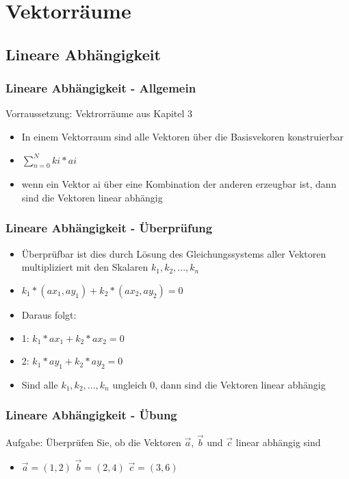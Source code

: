 \section{Vektorräume}
\subsection{Lineare Abhängigkeit}
\begin{frame}
    \frametitle{Lineare Abhängigkeit - Allgemein}
    Vorraussetzung: Vektrorräume aus Kapitel 3
    \begin{itemize}
        \item In einem Vektorraum sind alle Vektoren über die Basisvekoren konstruierbar
        \item $\sum\nolimits_{n=0}^N ki * ai$ 
        \item wenn ein Vektor ai über eine Kombination der anderen erzeugbar ist, dann sind die Vektoren linear abhängig
        
    \end{itemize}
\end{frame}

\begin{frame}
    \frametitle{Lineare Abhängigkeit - Überprüfung}
    \begin{itemize}
        \item Überprüfbar ist dies durch Lösung des Gleichungssystems aller Vektoren multipliziert mit den Skalaren $k_1, k_2, ..., k_n$
        \item $k_1 * (ax_1, ay_1) + k_2* (ax_2, ay_2) = 0$ 
	\item Daraus folgt:
        \item 1: $k_1 * ax_1 + k_2* ax_2 = 0$
        \item 2: $k_1 * ay_1 + k_2* ay_2 = 0$
        \item Sind alle $k_1, k_2, ..., k_n$ ungleich 0, dann sind die Vektoren linear abhängig
    \end{itemize}
\end{frame}

\begin{frame}
    \frametitle{Lineare Abhängigkeit - Übung}
    Aufgabe: Überprüfen Sie, ob die Vektoren $\vec{a}$, $\vec{b}$ und $\vec{c}$ linear abhängig sind
    \begin{itemize}
        \item $\vec{a} = (1, 2)$ $\vec{b} = (2, 4)$ $\vec{c} = (3, 6)$
        
    \end{itemize}
\end{frame}

